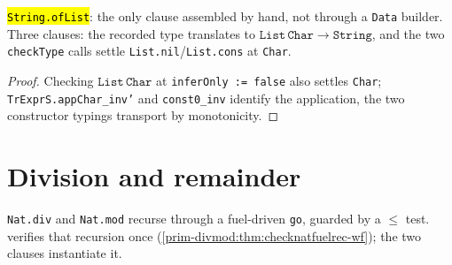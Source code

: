 \begin{theorem}
  \label{prim-clauses:thm:checkstringoflist-wf}
  \leanok

   \hl{\texttt{String.ofList}}: the only clause assembled by hand, not through a
  \texttt{Data} builder.
  Three clauses: the recorded type translates to $\mathtt{List}\,\mathtt{Char} \to \mathtt{String}$,
  and the two \texttt{checkType} calls settle \texttt{List.nil}/\texttt{List.cons} at
  \texttt{Char}.
\end{theorem}
\begin{proof}
  \leanok
   Checking $\mathtt{List}\,\mathtt{Char}$ at \texttt{inferOnly := false} also settles
  \texttt{Char}; \texttt{TrExprS.appChar\_inv'} and \texttt{const0\_inv} identify the application,
  the two constructor typings transport by monotonicity.
\end{proof}

\section{Division and remainder}

\texttt{Nat.div} and \texttt{Nat.mod} recurse through a fuel-driven \texttt{go}, guarded by a
$\le$ test.  verifies that recursion
once (\ref{prim-divmod:thm:checknatfuelrec-wf}); the two clauses instantiate it.


